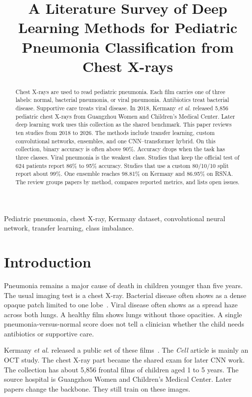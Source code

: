 \documentclass[conference]{IEEEtran}
\begin{document}
\title{A Literature Survey of Deep Learning Methods for Pediatric Pneumonia Classification from Chest X-rays}

\author{}

\maketitle

\begin{abstract}
Chest X-rays are used to read pediatric pneumonia. Each film carries one of three labels: normal, bacterial pneumonia, or viral pneumonia. Antibiotics treat bacterial disease. Supportive care treats viral disease. In 2018, Kermany \textit{et al.} released 5{,}856 pediatric chest X-rays from Guangzhou Women and Children's Medical Center. Later deep learning work uses this collection as the shared benchmark. This paper reviews ten studies from 2018 to 2026. The methods include transfer learning, custom convolutional networks, ensembles, and one CNN--transformer hybrid. On this collection, binary accuracy is often above 90\%. Accuracy drops when the task has three classes. Viral pneumonia is the weakest class. Studies that keep the official test of 624 patients report 86\% to 95\% accuracy. Studies that use a custom 80/10/10 split report about 99\%. One ensemble reaches 98.81\% on Kermany and 86.95\% on RSNA. The review groups papers by method, compares reported metrics, and lists open issues.
\end{abstract}

\begin{IEEEkeywords}
Pediatric pneumonia, chest X-ray, Kermany dataset, convolutional neural network, transfer learning, class imbalance.
\end{IEEEkeywords}

\section{Introduction}
Pneumonia remains a major cause of death in children younger than five years. The usual imaging test is a chest X-ray. Bacterial disease often shows as a dense opaque patch limited to one lobe~\cite{kermany2018}. Viral disease often shows as a spread haze across both lungs. A healthy film shows lungs without those opacities. A single pneumonia-versus-normal score does not tell a clinician whether the child needs antibiotics or supportive care.

Kermany \textit{et al.} released a public set of these films~\cite{kermany2018}. The \textit{Cell} article is mainly an OCT study. The chest X-ray part became the shared exam for later CNN work. The collection has about 5{,}856 frontal films of children aged 1 to 5 years. The source hospital is Guangzhou Women and Children's Medical Center. Later papers change the backbone. They still train on these images.
\end{document}
